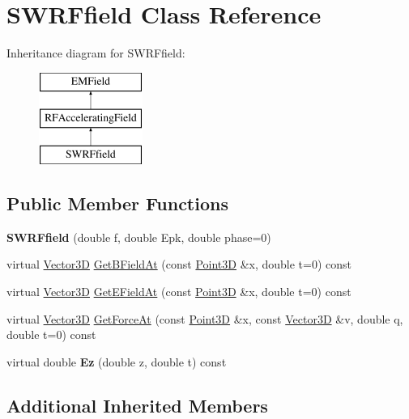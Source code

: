 \hypertarget{classSWRFfield}{}\section{S\+W\+R\+Ffield Class Reference}
\label{classSWRFfield}
Inheritance diagram for S\+W\+R\+Ffield\+:\begin{figure}[H]
\begin{center}
\leavevmode
\includegraphics[height=3.000000cm]{classSWRFfield}
\end{center}
\end{figure}
\subsection*{Public Member Functions}
\begin{DoxyCompactItemize}
\item 
\mbox{\label{classSWRFfield_a596ace19be9f11ade6e29fde1692986d}} 
{\bfseries S\+W\+R\+Ffield} (double f, double Epk, double phase=0)
\item 
virtual \hyperlink{classTVec3D}{Vector3D} \hyperlink{classSWRFfield_a95ebdd2f637626f2015d37680f7c00d0}{Get\+B\+Field\+At} (const \hyperlink{classTVec3D}{Point3D} \&x, double t=0) const
\item 
virtual \hyperlink{classTVec3D}{Vector3D} \hyperlink{classSWRFfield_ac40ae5a64589c9e36c0fc826633851bb}{Get\+E\+Field\+At} (const \hyperlink{classTVec3D}{Point3D} \&x, double t=0) const
\item 
virtual \hyperlink{classTVec3D}{Vector3D} \hyperlink{classSWRFfield_a72eee724db2bc2e21d100bb0c684a590}{Get\+Force\+At} (const \hyperlink{classTVec3D}{Point3D} \&x, const \hyperlink{classTVec3D}{Vector3D} \&v, double q, double t=0) const
\item 
\mbox{\label{classSWRFfield_a119b9f86dcfaf7937ec5bb440163c443}} 
virtual double {\bfseries Ez} (double z, double t) const
\end{DoxyCompactItemize}
\subsection*{Additional Inherited Members}


